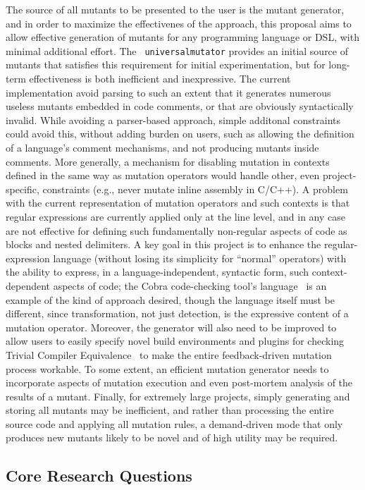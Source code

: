 The source of all mutants to be presented to the user is the mutant
generator, and in order to maximize the effectivenes of the approach,
this proposal aims to allow effective generation of mutants for any
programming 
language or DSL, with minimal additional effort.  The {\tt
  universalmutator} provides an initial source of mutants that
satisfies this requirement for initial experimentation, but for
long-term effectiveness is both inefficient and inexpressive.  The
current implementation avoid parsing to such an extent that it
generates numerous useless mutants embedded in code comments, or that
are obviously syntactically invalid.  While avoiding a parser-based
approach, simple additonal constraints could avoid this, without
adding burden on users, such as allowing the definition of a
language's comment mechanisms, and not producing mutants inside
comments.  More generally, a mechanism for disabling mutation in
contexts defined in the same way as mutation operators would handle
other, even project-specific, constraints (e.g., never mutate inline
assembly in C/C++).  A problem with the current representation of
mutation operators and such contexts is that regular expressions are
currently applied only at the line level, and in any case are not
effective for defining such fundamentally non-regular aspects of code
as blocks and nested delimiters.  A key goal in this project is to
enhance the regular-expression language (without losing its simplicity
for ``normal'' operators) with the ability to express, in a
language-independent, syntactic form, such context-dependent aspects
of code; the Cobra code-checking tool's language~\cite{Cobra} is an
example of the kind of approach desired, though the language itself
must be different, since transformation,
not just detection, is the expressive content of a mutation operator.
Moreover, the generator will also need to be improved to allow users
to easily specify novel build environments and plugins for checking
Trivial Compiler Equivalence~\cite{TCE} to make the entire feedback-driven
mutation process workable.  To some extent, an efficient mutation
generator needs to incorporate aspects of mutation execution and even
post-mortem analysis of the results of a mutant.  Finally, for
extremely large projects, simply generating and storing all mutants
may be inefficient, and rather than processing the entire source code
and applying all mutation rules, a demand-driven mode that only
produces new mutants likely to be novel and of high utility may be required.

\subsection{Core Research Questions}

